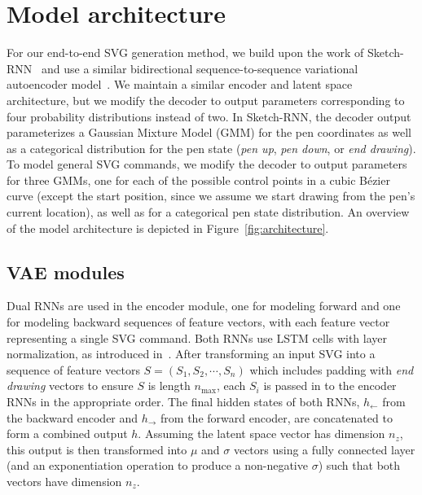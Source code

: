 \chapter{Model architecture}\label{chap:architecture}
For our end-to-end SVG generation method, we build upon the work of Sketch-RNN~\citeauthor{ha2017neural} and use a similar bidirectional sequence-to-sequence variational autoencoder model~\cite{ha2017neural}.
We maintain a similar encoder and latent space architecture, but we modify the decoder to output parameters corresponding to four probability distributions instead of two.
In Sketch-RNN, the decoder output parameterizes a Gaussian Mixture Model (GMM) for the pen coordinates as well as a categorical distribution for the pen state (\textit{pen up}, \textit{pen down}, or \textit{end drawing}).
To model general SVG commands, we modify the decoder to output parameters for three GMMs, one for each of the possible control points in a cubic B\'ezier curve (except the start position, since we assume we start drawing from the pen's current location), as well as for a categorical pen state distribution.
An overview of the model architecture is depicted in Figure~\ref{fig:architecture}.

\section{VAE modules}
Dual RNNs are used in the encoder module, one for modeling forward and one for modeling backward sequences of feature vectors, with each feature vector representing a single SVG command.
Both RNNs use LSTM cells with layer normalization, as introduced in~\cite{ba2016layer}.
After transforming an input SVG into a sequence of feature vectors $S = (S_1, S_2, \cdots, S_n)$ which includes padding with \textit{end drawing} vectors to ensure $S$ is length $n_\text{max}$, each $S_i$ is passed in to the encoder RNNs in the appropriate order.
The final hidden states of both RNNs, $h_\leftarrow$ from the backward encoder and $h_\to$ from the forward encoder, are concatenated to form a combined output $h$.
Assuming the latent space vector has dimension $n_z$, this output is then transformed into $\mu$ and $\sigma$ vectors using a fully connected layer (and an exponentiation operation to produce a non-negative $\sigma$) such that both vectors have dimension $n_z$.


